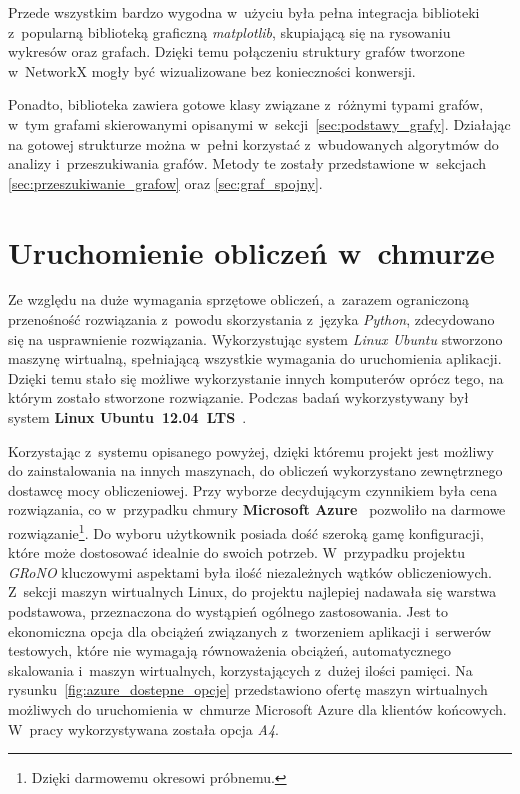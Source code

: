 \documentclass[twoside,12pt]{report}
\begin{document}
Przede wszystkim bardzo wygodna w~użyciu była pełna integracja biblioteki z~popularną biblioteką graficzną \textit{matplotlib}, skupiającą się na rysowaniu wykresów oraz grafach. Dzięki temu połączeniu struktury grafów tworzone w~NetworkX mogły być wizualizowane bez konieczności konwersji. 

Ponadto, biblioteka zawiera gotowe klasy związane z~różnymi typami grafów, w~tym grafami skierowanymi opisanymi w~sekcji~\ref{sec:podstawy_grafy}. Działając na gotowej strukturze można w~pełni korzystać z~wbudowanych algorytmów do analizy i~przeszukiwania grafów. Metody te zostały przedstawione w~sekcjach \ref{sec:przeszukiwanie_grafow} oraz \ref{sec:graf_spojny}.

\section{Uruchomienie obliczeń w~chmurze}
Ze względu na duże wymagania sprzętowe obliczeń, a~zarazem ograniczoną przenośność rozwiązania z~powodu skorzystania z~języka \textit{Python}, zdecydowano się na usprawnienie rozwiązania. Wykorzystując system \textit{Linux Ubuntu} stworzono maszynę wirtualną, spełniającą wszystkie wymagania do uruchomienia aplikacji. Dzięki temu stało się możliwe wykorzystanie innych komputerów oprócz tego, na którym zostało stworzone rozwiązanie. Podczas badań wykorzystywany był system \textbf{Linux Ubuntu~12.04~LTS}~\cite{ubuntu}.

Korzystając z~systemu opisanego powyżej, dzięki któremu projekt jest możliwy do zainstalowania na innych maszynach, do obliczeń wykorzystano zewnętrznego dostawcę mocy obliczeniowej. Przy wyborze decydującym czynnikiem była cena rozwiązania, co w~przypadku chmury\textbf{ Microsoft Azure}~\cite{azure} pozwoliło na darmowe rozwiązanie\footnote{Dzięki darmowemu okresowi próbnemu.}. Do wyboru użytkownik posiada dość szeroką gamę konfiguracji, które może dostosować idealnie do swoich potrzeb. W~przypadku projektu \textit{GRoNO} kluczowymi aspektami była ilość niezależnych wątków obliczeniowych. Z~sekcji maszyn wirtualnych Linux, do projektu najlepiej nadawała się warstwa podstawowa, przeznaczona do wystąpień ogólnego zastosowania. Jest to ekonomiczna opcja dla obciążeń związanych z~tworzeniem aplikacji i~serwerów testowych, które nie wymagają równoważenia obciążeń, automatycznego skalowania i~maszyn wirtualnych, korzystających z~dużej ilości pamięci. Na rysunku~\ref{fig:azure_dostepne_opcje} przedstawiono ofertę maszyn wirtualnych możliwych do uruchomienia w~chmurze Microsoft Azure dla klientów końcowych. W~pracy wykorzystywana została opcja \textit{A4}.
\end{document}
